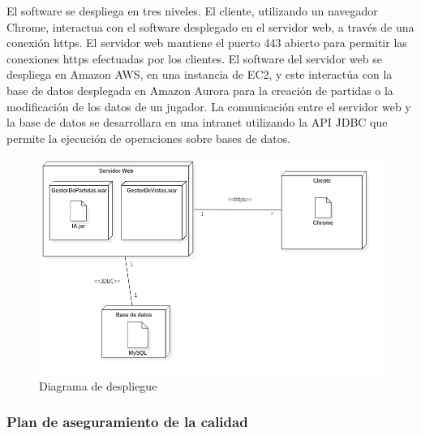 El software se despliega en tres niveles. El cliente, utilizando un navegador Chrome, interactua con el software desplegado en el servidor web, a través de una conexión https. El servidor web mantiene  el puerto 443 abierto para permitir las conexiones https efectuadas por los clientes. El software del servidor web se despliega en Amazon AWS, en una instancia de EC2, y este interactúa con la base de datos desplegada en Amazon Aurora para la creación de partidas o la modificación de los datos de un jugador. La comunicación entre el servidor web y la base de datos se desarrollara en una intranet utilizando la API JDBC que permite la ejecución de operaciones sobre bases de datos.

\begin{figure}[H]
\centering
\includegraphics[scale = 0.4]{figuras/despliegue.jpg}
\caption{Diagrama de despliegue}
\label{fig:diagramaDespliegue}
\end{figure}

\subsubsection{Plan de aseguramiento de la calidad}

